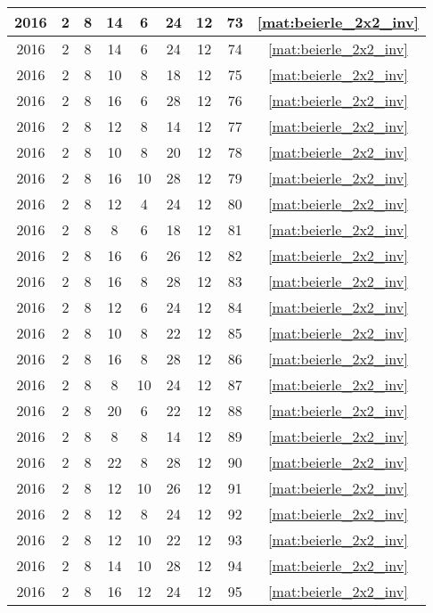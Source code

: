 \begin{longtable}{|c|c|c|c|c|c|c|c|c|}
2016 & 2 & 8 & 14 & 6 & 24 & 12 & 73 & \eqref{mat:beierle_2x2_inv} \\ \hline 
2016 & 2 & 8 & 14 & 6 & 24 & 12 & 74 & \eqref{mat:beierle_2x2_inv} \\ \hline 
2016 & 2 & 8 & 10 & 8 & 18 & 12 & 75 & \eqref{mat:beierle_2x2_inv} \\ \hline 
2016 & 2 & 8 & 16 & 6 & 28 & 12 & 76 & \eqref{mat:beierle_2x2_inv} \\ \hline 
2016 & 2 & 8 & 12 & 8 & 14 & 12 & 77 & \eqref{mat:beierle_2x2_inv} \\ \hline 
2016 & 2 & 8 & 10 & 8 & 20 & 12 & 78 & \eqref{mat:beierle_2x2_inv} \\ \hline 
2016 & 2 & 8 & 16 & 10 & 28 & 12 & 79 & \eqref{mat:beierle_2x2_inv} \\ \hline 
2016 & 2 & 8 & 12 & 4 & 24 & 12 & 80 & \eqref{mat:beierle_2x2_inv} \\ \hline 
2016 & 2 & 8 & 8 & 6 & 18 & 12 & 81 & \eqref{mat:beierle_2x2_inv} \\ \hline 
2016 & 2 & 8 & 16 & 6 & 26 & 12 & 82 & \eqref{mat:beierle_2x2_inv} \\ \hline 
2016 & 2 & 8 & 16 & 8 & 28 & 12 & 83 & \eqref{mat:beierle_2x2_inv} \\ \hline 
2016 & 2 & 8 & 12 & 6 & 24 & 12 & 84 & \eqref{mat:beierle_2x2_inv} \\ \hline 
2016 & 2 & 8 & 10 & 8 & 22 & 12 & 85 & \eqref{mat:beierle_2x2_inv} \\ \hline 
2016 & 2 & 8 & 16 & 8 & 28 & 12 & 86 & \eqref{mat:beierle_2x2_inv} \\ \hline 
2016 & 2 & 8 & 8 & 10 & 24 & 12 & 87 & \eqref{mat:beierle_2x2_inv} \\ \hline 
2016 & 2 & 8 & 20 & 6 & 22 & 12 & 88 & \eqref{mat:beierle_2x2_inv} \\ \hline 
2016 & 2 & 8 & 8 & 8 & 14 & 12 & 89 & \eqref{mat:beierle_2x2_inv} \\ \hline 
2016 & 2 & 8 & 22 & 8 & 28 & 12 & 90 & \eqref{mat:beierle_2x2_inv} \\ \hline 
2016 & 2 & 8 & 12 & 10 & 26 & 12 & 91 & \eqref{mat:beierle_2x2_inv} \\ \hline 
2016 & 2 & 8 & 12 & 8 & 24 & 12 & 92 & \eqref{mat:beierle_2x2_inv} \\ \hline 
2016 & 2 & 8 & 12 & 10 & 22 & 12 & 93 & \eqref{mat:beierle_2x2_inv} \\ \hline 
2016 & 2 & 8 & 14 & 10 & 28 & 12 & 94 & \eqref{mat:beierle_2x2_inv} \\ \hline 
2016 & 2 & 8 & 16 & 12 & 24 & 12 & 95 & \eqref{mat:beierle_2x2_inv} \\ \hline 

\end{longtable}

